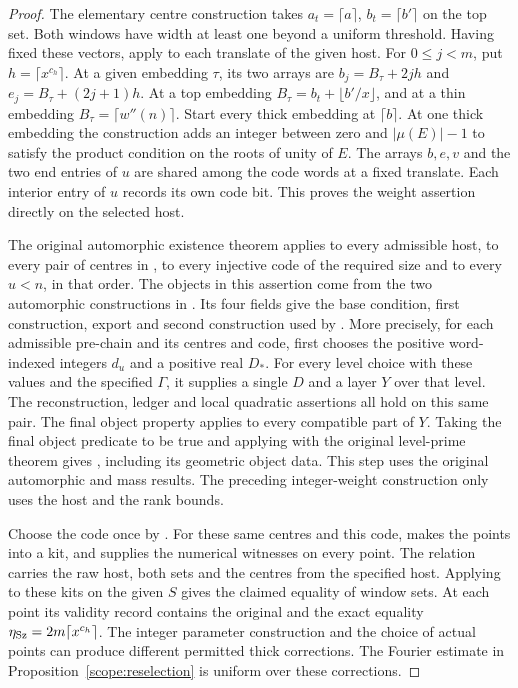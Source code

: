 \begin{proof}
The elementary centre construction 
takes \(a_t=\lceil a\rceil\), \(b_t=\lceil b'\rceil\) on the top set.
Both windows have width at least one beyond a uniform threshold.
Having fixed these vectors, apply  to each
translate of the given host. For \(0\le j<m\), put
\(h=\lceil x^{c_h}\rceil\). At a given embedding \(\tau\), its two arrays
are \(b_j=B_\tau+2jh\) and \(e_j=B_\tau+(2j+1)h\).
At a top embedding \(B_\tau=b_t+\lfloor b'/x\rfloor\), and at a thin
embedding \(B_\tau=\lceil w''(n)\rceil\). Start every thick embedding at
\(\lceil b\rceil\). At one thick embedding the construction adds an
integer between zero and \(\lvert\mu(E)\rvert-1\) to satisfy the product
condition on the roots of unity of \(E\). The arrays \(b,e,v\) and the
two end entries of \(u\) are shared among the code words at a fixed
translate. Each interior entry of \(u\) records its own code bit. This
proves the weight assertion directly on the selected host.

The original automorphic existence theorem applies to every admissible
host, to every pair of centres in , to every injective code of
the required size and to every \(u<n\), in that order. The objects in this
assertion come from the two automorphic constructions in
. Its four fields give the base condition, first construction,
export and second construction used by
. More precisely, for each
admissible pre-chain and its centres and code,  first
chooses the positive word-indexed integers \(d_u\) and a positive real
\(D_*\). For every level choice with these values and the specified
\(\Gamma\), it supplies a single \(D\) and a layer \(Y\) over that level.
The reconstruction, ledger and local quadratic assertions all hold on
this same pair. The final object property applies to every compatible
part of \(Y\). Taking the final object
predicate to be true and applying
 with the original level-prime
theorem gives , including its geometric object data.
This step uses the original automorphic and mass results. The preceding
integer-weight construction only uses the host and the rank bounds.

Choose the code once by . For these same
centres and this code,  makes the points into a kit,
and  supplies the numerical witnesses on every point.
The relation  carries the raw host, both sets and the centres
from the specified host. Applying  to these
kits on the given \(S\) gives the claimed equality of window sets.
At each point its validity record contains the original  and
the exact equality \(\eta_{\rm Sz}=2m\lceil x^{c_h}\rceil\). The integer
parameter construction and the choice of actual points can produce
different permitted thick corrections. The Fourier estimate in
Proposition~\ref{scope:reselection} is uniform over these corrections.
\end{proof}

